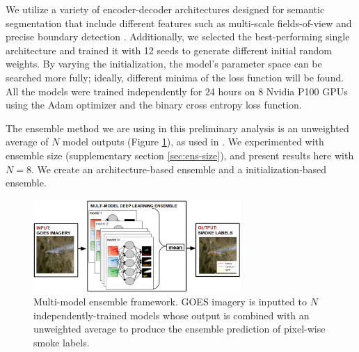\documentclass{article}
\begin{document}
We utilize a variety of encoder-decoder architectures designed for semantic segmentation that include different features such as multi-scale fields-of-view and precise boundary detection \citep{dlv3p,PAN,UNetpp}. Additionally, we selected the best-performing single architecture and trained it with 12 seeds to generate different initial random weights. By varying the initialization, the model's parameter space can be searched more fully; ideally, different minima of the loss function will be found. All the models were trained independently for 24 hours on 8 Nvidia P100 GPUs using the Adam optimizer and the binary cross entropy loss function. 

The ensemble method we are using in this preliminary analysis is an unweighted average of $N$ model outputs (Figure \ref{fig:ensemble_framework}), as used in \citep{ensemble-fire-Sivanuja, nn-ensemble2}. We experimented with ensemble size (supplementary section \ref{sec:ens-size}), and present results here with $N=8$. We create an architecture-based ensemble and a initialization-based ensemble.


\begin{figure}
    \centering
    \includegraphics[width=0.7\textwidth]{ensemble_framework.png}
    \caption{\RaggedRight Multi-model ensemble framework. GOES imagery is inputted to $N$ independently-trained models whose output is combined with an unweighted average to produce the ensemble prediction of pixel-wise smoke labels.}
    \label{fig:ensemble_framework}
\end{figure}
\end{document}
